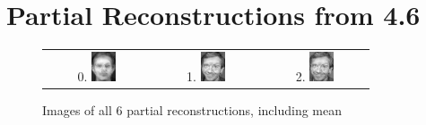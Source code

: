 \documentclass[10pt,a4paper]{article}
\begin{document}
\FloatBarrier
\section{Partial Reconstructions from 4.6}
\begin{figure}[h!]
  \caption{Images of all 6 partial reconstructions, including mean}
  \centering
  
  \begin{tabular}{ c c c }
    0. \includegraphics[width=0.25\textwidth]{Final/PartialReconstruction0.jpg} & 1. \includegraphics[width=0.25\textwidth]{Final/PartialReconstruction1.jpg} & 2. \includegraphics[width=0.25\textwidth]{Final/PartialReconstruction2.jpg} \\

\end{tabular}
\end{figure}
\end{document}
